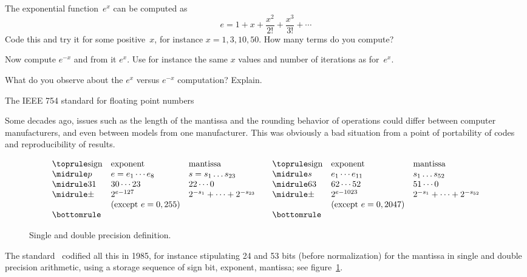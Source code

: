 \begin{exercise}
  The exponential function~$e^x$ can be computed as
  \begin{equation}
    e=1+x+\frac{x^2}{2!}+\frac{x^3}{3!}+\cdots
  \end{equation}
  Code this and try it for some positive~$x$,
  for instance $x=1,3,10,50$.
  How many terms do you compute?

  Now compute $e^{-x}$ and from it $e^x$.
  Use for instance the same $x$ values and
  number of iterations as for~$e^x$.

  What do you observe about the $e^x$ versus $e^{-x}$
  computation? Explain.
\end{exercise}


 {The IEEE 754 standard for floating point numbers}
\label{sec:ieee754}

Some decades ago, issues such as the length of the
mantissa and the rounding behavior of operations
could differ between computer manufacturers, and even between models
from one manufacturer. This was obviously a bad situation from a point
of portability of codes and reproducibility of results.
\begin{figure}[ht]
  \begin{equation}
  \begin{array}{ l l l }
    \toprule
    \hbox{sign}&\hbox{exponent}&\hbox{mantissa}\\
    \midrule
    p&e=e_1\cdots e_8 &s=s_1\dots s_{23}\\
    \midrule
    31&30\cdots 23&22\cdots 0\\
    \midrule
    \pm & 2^{e-127} & 2^{-s_1}+\cdots + 2^{-s_{23}} \\
    & \hbox{(except $e=0,255$)} & \\
    \bottomrule
  \end{array}\quad
  \begin{array}{ lll }
    \toprule
    \hbox{sign}&\hbox{exponent}&\hbox{mantissa}\\
    \midrule
    s&e_1\cdots e_{11}&s_1\dots s_{52}\\
    \midrule
    63&62\cdots 52&51\cdots 0\\
    \midrule
    \pm & 2^{e-1023} & 2^{-s_1}+\cdots + 2^{-s_{52}} \\
    & \hbox{(except $e=0,2047$)} & \\
    \bottomrule
  \end{array}
  \end{equation}
  \caption{Single and double precision definition.}
  \label{fig:single-double}
\end{figure}
The  standard~\cite{754-2019}
codified all this in 1985, for instance stipulating 24 and 53 bits
(before normalization)
for the
mantissa in single and double precision arithmetic,
using a storage sequence of sign bit, exponent, mantissa;
see figure~\ref{fig:single-double}.

